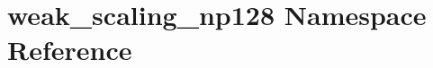\hypertarget{namespaceweak__scaling__np128}{}\section{weak\+\_\+scaling\+\_\+np128 Namespace Reference}
\label{namespaceweak__scaling__np128}
